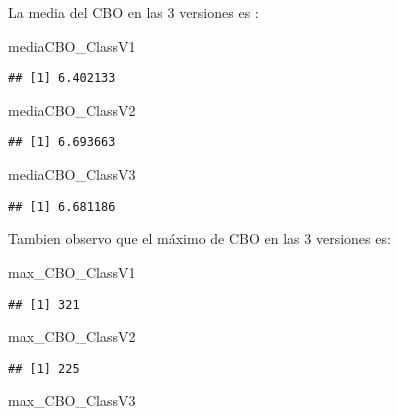 \documentclass[
]{article}
\newenvironment{Shaded}{\begin{snugshade}}{\end{snugshade}}
\newcommand{\NormalTok}[1]{#1}
\begin{document}
La media del CBO en las 3 versiones es :

\begin{Shaded}
\begin{Highlighting}[]
\NormalTok{mediaCBO\_ClassV1}
\end{Highlighting}
\end{Shaded}

\begin{verbatim}
## [1] 6.402133
\end{verbatim}

\begin{Shaded}
\begin{Highlighting}[]
\NormalTok{mediaCBO\_ClassV2}
\end{Highlighting}
\end{Shaded}

\begin{verbatim}
## [1] 6.693663
\end{verbatim}

\begin{Shaded}
\begin{Highlighting}[]
\NormalTok{mediaCBO\_ClassV3}
\end{Highlighting}
\end{Shaded}

\begin{verbatim}
## [1] 6.681186
\end{verbatim}

Tambien observo que el máximo de CBO en las 3 versiones es:

\begin{Shaded}
\begin{Highlighting}[]
\NormalTok{max\_CBO\_ClassV1}
\end{Highlighting}
\end{Shaded}

\begin{verbatim}
## [1] 321
\end{verbatim}

\begin{Shaded}
\begin{Highlighting}[]
\NormalTok{max\_CBO\_ClassV2}
\end{Highlighting}
\end{Shaded}

\begin{verbatim}
## [1] 225
\end{verbatim}

\begin{Shaded}
\begin{Highlighting}[]
\NormalTok{max\_CBO\_ClassV3}
\end{Highlighting}
\end{Shaded}
\end{document}
